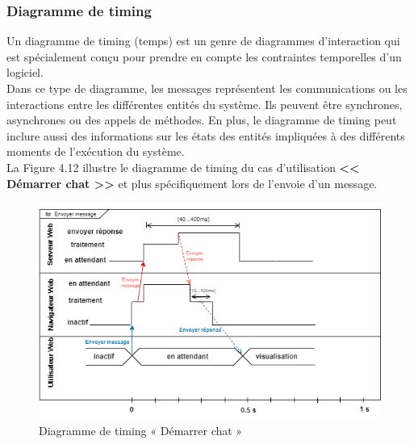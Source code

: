 \subsubsection{Diagramme de timing}
Un diagramme de timing (temps) est un genre de diagrammes d'interaction qui est spécialement conçu pour prendre en compte les contraintes temporelles d'un logiciel.\\
Dans ce type de diagramme, les messages représentent les communications ou les interactions entre les différentes entités du système. Ils peuvent être synchrones, asynchrones ou des appels de méthodes. En plus, le diagramme de timing peut inclure aussi des informations sur les états des entités impliquées à des différents moments de l’exécution du système.\\
La Figure 4.12 illustre le diagramme de timing du cas d’utilisation \textbf{<< Démarrer chat >>} et plus spécifiquement lors de l’envoie d’un message.

\begin{figure}[H]
    \centering
    \includegraphics[width=\textwidth]{images/chp4/fig12.png}
    \caption{Diagramme de timing « Démarrer chat »}
    \label{fig:Diagramme de timing « Démarrer chat »}    
\end{figure}

